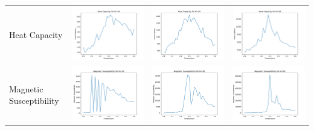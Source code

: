 \documentclass[10pt]{article} %
\begin{document}
\begin{tabular}{p{2cm} | >{\centering\arraybackslash}m{5cm} >{\centering\arraybackslash}m{5cm} >{\centering\arraybackslash}m{5cm}}
Heat Capacity & \includegraphics[width=.3\textwidth]{../figs/q3_N10_C.pdf} & \includegraphics[width=.3\textwidth]{../figs/q3_N20_C.pdf} & \includegraphics[width=.3\textwidth]{../figs/q3_N50_C.pdf} \\
Magnetic Susceptibility & \includegraphics[width=.3\textwidth]{../figs/q3_N10_X.pdf} & \includegraphics[width=.3\textwidth]{../figs/q3_N20_X.pdf} & \includegraphics[width=.3\textwidth]{../figs/q3_N50_X.pdf} \\
\end{tabular}
\end{document}
